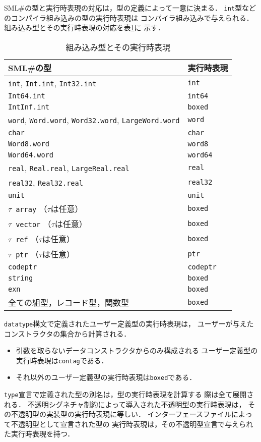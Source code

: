 \documentclass{jbook}
\newcommand{\smlsharp}{SML\#}
\begin{document}
	\smlsharp{}の型と実行時表現の対応は，型の定義によって一意に決まる．
	{\tt int}型などのコンパイラ組み込みの型の実行時表現は
コンパイラ組み込みで与えられる．
	組み込み型とその実行時表現の対応を表\ref{tab:builtinRuntimeTypes}に
示す．
\begin{table}
\begin{center}
\begin{tabular}{|l|l|}
\hline
\smlsharp{}の型 & 実行時表現 \\ \hline
{\tt int}, {\tt Int.int}, {\tt Int32.int} & {\tt int} \\
{\tt Int64.int} & {\tt int64} \\
{\tt IntInf.int} & {\tt boxed} \\
{\tt word}, {\tt Word.word}, {\tt Word32.word}, {\tt LargeWord.word} & {\tt word} \\
{\tt char} & {\tt char} \\
{\tt Word8.word} & {\tt word8} \\
{\tt Word64.word} & {\tt word64} \\
{\tt real}, {\tt Real.real}, {\tt LargeReal.real} & {\tt real} \\
{\tt real32}, {\tt Real32.real} & {\tt real32} \\
{\tt unit} & {\tt unit} \\
{\tt $\tau$ array} （$\tau$は任意）& {\tt boxed}\\
{\tt $\tau$ vector} （$\tau$は任意） & {\tt boxed}\\
{\tt $\tau$ ref} （$\tau$は任意） & {\tt boxed}\\
{\tt $\tau$ ptr} （$\tau$は任意） & {\tt ptr}\\
{\tt codeptr} & {\tt codeptr}\\
{\tt string} & {\tt boxed}\\
{\tt exn} & {\tt boxed}\\
全ての組型，レコード型，関数型 & {\tt boxed}\\
\hline
\end{tabular}
\end{center}
\caption{組み込み型とその実行時表現}
\label{tab:builtinRuntimeTypes}
\end{table}
	{\tt datatype}構文で定義されたユーザー定義型の実行時表現は，
ユーザーが与えたコンストラクタの集合から計算される．
\begin{itemize}
\item
	引数を取らないデータコンストラクタからのみ構成される
ユーザー定義型の実行時表現は{\tt contag}である．
\item
	それ以外のユーザー定義型の実行時表現は{\tt boxed}である．
\end{itemize}
	{\tt type}宣言で定義された型の別名は，型の実行時表現を計算する
際は全て展開される．
	不透明シグネチャ制約によって導入された不透明型の実行時表現は，
その不透明型の実装型の実行時表現に等しい．
	インターフェースファイルによって不透明型として宣言された型の
実行時表現は，その不透明型宣言で与えられた実行時表現を持つ．
\end{document}
